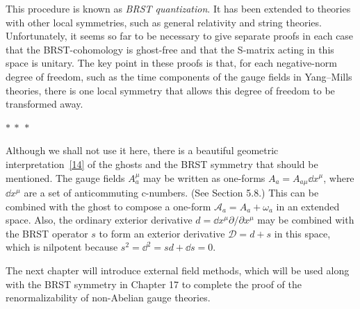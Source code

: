 This procedure is known as \emph{BRST quantization}. It has been extended to theories with other local symmetries, such as general relativity and string theories. Unfortunately, it seems so far to be necessary to give separate proofs in each case that the BRST-cohomology is ghost-free and that the S-matrix acting in this space is unitary. The key point in these proofs is that, for each negative-norm degree of freedom, such as the time components of the gauge fields in Yang--Mills theories, there is one local symmetry that allows this degree of freedom to be transformed away.

\begin{center}
$*\ *\ *$
\end{center}

Although we shall not use it here, there is a beautiful geometric interpretation~\hyperref[ch15-ref-14]{[14]} of the ghosts and the BRST symmetry that should be mentioned. The gauge fields $A_a^\mu$ may be written as one-forms $A_a=A_{a\mu}\dd x^\mu$, where $\dd x^\mu$ are a set of anticommuting c-numbers. (See Section 5.8.) This can be combined with the ghost to compose a one-form $\mathcal A_a=A_a+\omega_a$ in an extended space. Also, the ordinary exterior derivative $d=\dd x^\mu\partial/\partial x^\mu$ may be combined with the BRST operator $s$ to form an exterior derivative $\mathcal D=d+s$ in this space, which is nilpotent because $s^2=\dd^2=sd+\dd s=0$.

The next chapter will introduce external field methods, which will be used along with the BRST symmetry in Chapter 17 to complete the proof of the renormalizability of non-Abelian gauge theories.
